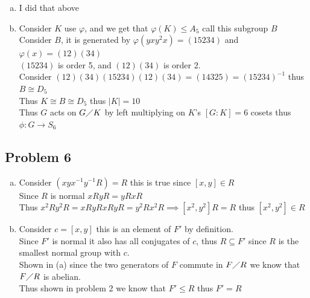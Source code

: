 \documentclass[12pt, letterpaper]{article}
\theoremstyle{definition}
\begin{document}
\begin{enumerate}[(a)]
    Consider $K$, it is generated by $\varphi(y^2xyxy)=(142)$ and $\varphi(x)=(12)(34)$\\
    Since $K$ is generated by even permutations with only 4 elements we know that $K \leq A_4$\\
    We know $K$ has at least $5$ elements $\{e,(142),(124),(12)(34),(142)(12)(34)=(243)\}$ thus $|K|=12$ since if $|K|=6$ then since $G$ has no
    element of order $6$ is must be $S_3$ and $S_3$ has 3 elements of order 2 thus $K$ must have 3 double transpositions but theese form a subroup of order 4 but 4 does not divide 6 thus
    $|K|=12$
    Thus $G$ acts on $G \diagup H$ by left multiplying on $H$'s $[G:H]=5$ cosets thus $\phi: G \rightarrow S_5$\\
    $H \cong K \cong A_4$
    \item I did that above
    \item Consider $K$ use $\varphi$, and we get that $\varphi(K) \leq A_5$ call this subgroup $B$\\
    Consider $B$, it is generated by $\varphi(yxy^2x)=(15234)$ and $\varphi(x)=(12)(34)$\\
    $(15234)$ is order 5, and $(12)(34)$ is order 2.\\
    Consider $(12)(34)(15234)(12)(34)=(14325)=(15234)^{-1}$ thus $B \cong D_5$\\
    Thus $K \cong B \cong D_5$ thus $|K|=10$\\
    Thus $G$ acts on $G \diagup K$ by left multiplying on $K$'s $[G:K]=6$ cosets thus $\phi: G \rightarrow S_6$\\
\end{enumerate}

\newpage
\subsection*{Problem 6}
\begin{enumerate}[(a)]
    \item Consider $(xyx^{-1}y^{-1}R)=R$ this is true since $[x,y] \in R$\\
    Since $R$ is normal $xRyR=yRxR$\\
    Thus $x^2Ry^2R=xRyRxRyR=y^2Rx^2R \implies [x^2,y^2]R=R$ thus $[x^2,y^2] \in R$
    \item Consider $c=[x,y]$ this is an element of $F'$ by definition.\\
    Since $F'$ is normal it also has all conjugates of $c$, thus $R \subseteq F'$ since $R$ is the smallest normal group with $c$.\\
    Shown in (a) since the two generators of $F$ commute in $F \diagup R$ we know that $F \diagup R$ is abelian.\\
    Thus shown in problem 2 we know that $F' \leq R$ thus $F' = R$
\end{enumerate}
\end{document}

